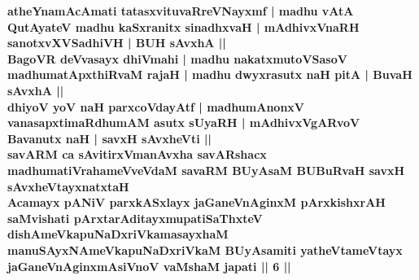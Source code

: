 \begin{artha}
{\bf atheYnamAcAmati tatasxvituvaRreVNayxmf | madhu vAtA QutAyateV madhu kaSxranitx sinadhxvaH | mAdhivxVnaRH sanotxvXVSadhiVH | BUH sAvxhA ||\\
BagoVR deVvasayx dhiVmahi | madhu nakatxmutoVSasoV madhumatApxthiRvaM rajaH | madhu dwyxrasutx naH pitA | BuvaH sAvxhA ||\\
dhiyoV yoV naH parxcoVdayAtf | madhumAnonxV vanasapxtimaRdhumAM asutx sUyaRH | mAdhivxVgARvoV Bavanutx naH | savxH sAvxheVti ||\\
savARM ca sAvitirxVmanAvxha savARshacx madhumatiVrahameVveVdaM savaRM BUyAsaM BUBuRvaH savxH sAvxheVtayxnatxtaH\\
Acamayx pANiV parxkASxlayx jaGaneVnAginxM pArxkishxrAH saMvishati pArxtarAditayxmupatiSaThxteV dishAmeVkapuNaDxriVkamasayxhaM \\
manuSAyxNAmeVkapuNaDxriVkaM BUyAsamiti yatheVtameVtayx jaGaneVnAginxmAsiVnoV vaMshaM japati || 6 ||}
\end{artha}	
